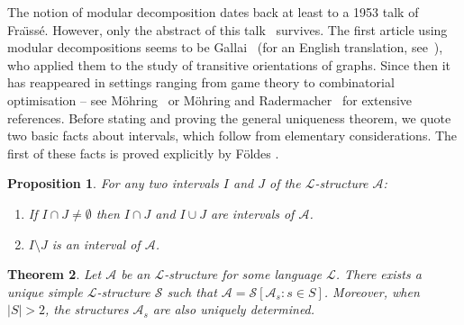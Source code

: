 \documentclass[11pt]{article}
\newtheorem{theorem}{Theorem}[section]
\newtheorem{proposition}[theorem]{Proposition}
\begin{document}
The notion of modular decomposition dates back at least to a 1953 talk
of Fra\"{\i}ss\'e.  However, only the abstract of this
talk~\cite{fraisse:on-a-decomposit:} survives.  The first article
using modular decompositions seems to be
Gallai~\cite{gallai:transitiv-orien:} (for an English translation,
see~\cite{gallai:a-translation-o:}), who applied them to the study of
transitive orientations of graphs. Since then it has reappeared in settings ranging from game theory to combinatorial optimisation
-- see M\"ohring~\cite{mohring:an-algebraic-de:} or M\"ohring and Radermacher~\cite{mohring:substitution-de:} for extensive references.
Before stating and proving the general uniqueness theorem, we quote two basic facts about intervals, which follow from elementary considerations.  The first of these facts is proved explicitly by F\"{o}ldes \cite{foldes:on-intervals-in:}.

\begin{proposition}\label{prop-foldes}
For any two intervals $I$ and $J$ of the $\mathcal{L}$-structure $\mathcal{A}$:
\begin{enumerate}
\item[\textup{(a)}] If $I\cap J \neq \emptyset$ then $I\cap J$ and $I\cup J$ are intervals of $\mathcal{A}$.
\item[\textup{(b)}] $I\setminus J$ is an interval of $\mathcal{A}$.
\end{enumerate}
\end{proposition}

\begin{theorem}\label{substdecompthm}Let $\mathcal{A}$ be an $\mathcal{L}$-structure for some language $\mathcal{L}$. There exists a unique simple $\mathcal{L}$-structure $\mathcal{S}$ such that $\mathcal{A}=\mathcal{S}[\mathcal{A}_s:s\in S]$. Moreover, when $|S| > 2$,
the structures $\mathcal{A}_s$ are also uniquely determined.
\end{theorem}
\end{document}
